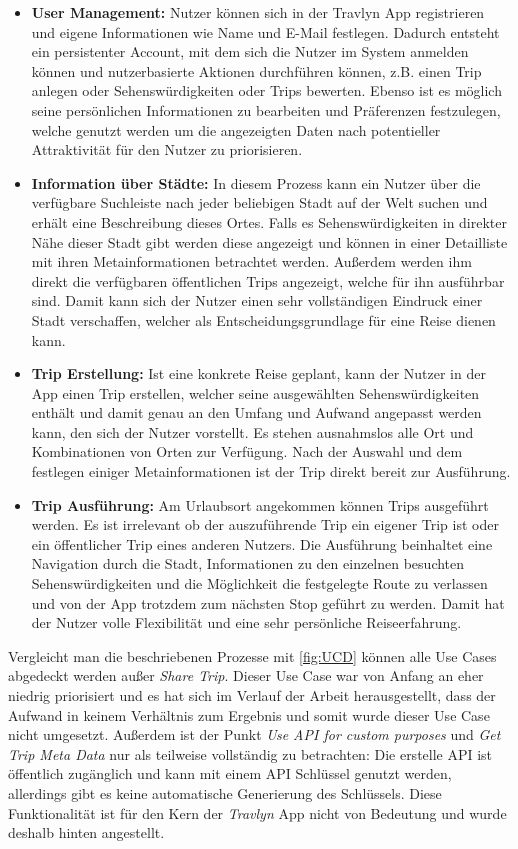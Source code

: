 \begin{itemize}
	\item \textbf{User Management:} Nutzer können sich in der Travlyn App registrieren und eigene Informationen wie Name und E-Mail festlegen. Dadurch entsteht ein persistenter Account, mit dem sich die Nutzer im System anmelden können und nutzerbasierte Aktionen durchführen können, z.B. einen Trip anlegen oder Sehenswürdigkeiten oder Trips bewerten. Ebenso ist es möglich seine persönlichen Informationen zu bearbeiten und Präferenzen festzulegen, welche genutzt werden um die angezeigten Daten nach potentieller Attraktivität für den Nutzer zu priorisieren. 
	\item \textbf{Information über Städte:} In diesem Prozess kann ein Nutzer über die verfügbare Suchleiste nach jeder beliebigen Stadt auf der Welt suchen und erhält eine Beschreibung dieses Ortes. Falls es Sehenswürdigkeiten in direkter Nähe dieser Stadt gibt werden diese angezeigt und können in einer Detailliste mit ihren Metainformationen betrachtet werden. Außerdem werden ihm direkt die verfügbaren öffentlichen Trips angezeigt, welche für ihn ausführbar sind. Damit kann sich der Nutzer einen sehr vollständigen Eindruck einer Stadt verschaffen, welcher als Entscheidungsgrundlage für eine Reise dienen kann.
	\item \textbf{Trip Erstellung:} Ist eine konkrete Reise geplant, kann der Nutzer in der App einen Trip erstellen, welcher seine ausgewählten Sehenswürdigkeiten enthält und damit genau an den Umfang und Aufwand angepasst werden kann, den sich der Nutzer vorstellt. Es stehen ausnahmslos alle Ort und Kombinationen von Orten zur Verfügung. Nach der Auswahl und dem festlegen einiger Metainformationen ist der Trip direkt bereit zur Ausführung.
	\item \textbf{Trip Ausführung:} Am Urlaubsort angekommen können Trips ausgeführt werden. Es ist irrelevant ob der auszuführende Trip ein eigener Trip ist oder ein öffentlicher Trip eines anderen Nutzers. Die Ausführung beinhaltet eine Navigation durch die Stadt, Informationen zu den einzelnen besuchten Sehenswürdigkeiten und die Möglichkeit die festgelegte Route zu verlassen und von der App trotzdem zum nächsten Stop geführt zu werden. Damit hat der Nutzer volle Flexibilität und eine sehr persönliche Reiseerfahrung.    
\end{itemize}

Vergleicht man die beschriebenen Prozesse mit \autoref{fig:UCD} können alle Use Cases abgedeckt werden außer \textit{Share Trip}. Dieser Use Case war von Anfang an eher niedrig priorisiert und es hat sich im Verlauf der Arbeit herausgestellt, dass der Aufwand in keinem Verhältnis zum Ergebnis und somit wurde dieser Use Case nicht umgesetzt. Außerdem ist der Punkt \textit{Use API for custom purposes} und \textit{Get Trip Meta Data} nur als teilweise vollständig zu betrachten: Die erstelle API ist öffentlich zugänglich und kann mit einem API Schlüssel genutzt werden, allerdings gibt es keine automatische Generierung des Schlüssels. Diese Funktionalität ist für den Kern der \textit{Travlyn} App nicht von Bedeutung und wurde deshalb hinten angestellt.

